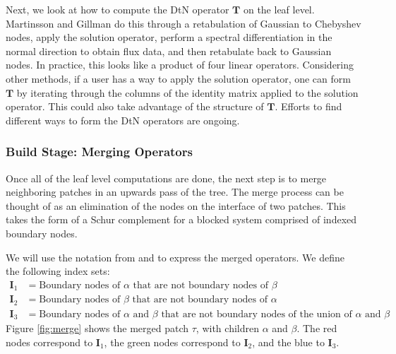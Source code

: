 Next, we look at how to compute the DtN operator $\textbf{T}$ on the leaf level. Martinsson and Gillman do this through a retabulation of Gaussian to Chebyshev nodes, apply the solution operator, perform a spectral differentiation in the normal direction to obtain flux data, and then retabulate back to Gaussian nodes. In practice, this looks like a product of four linear operators. Considering other methods, if a user has a way to apply the solution operator, one can form $\textbf{T}$ by iterating through the columns of the identity matrix applied to the solution operator. This could also take advantage of the structure of $\textbf{T}$. Efforts to find different ways to form the DtN operators are ongoing.

\subsubsection{Build Stage: Merging Operators}

Once all of the leaf level computations are done, the next step is to merge neighboring patches in an upwards pass of the tree. The merge process can be thought of as an elimination of the nodes on the interface of two patches. This takes the form of a Schur complement for a blocked system comprised of indexed boundary nodes.

We will use the notation from \cite{martinsson2015hierarchical} and \cite{gillman2014direct} to express the merged operators. We define the following index sets:
\begin{align*}
    \textbf{I}_1 &= \text{Boundary nodes of } \alpha \text{ that are not boundary nodes of } \beta \\
    \textbf{I}_2 &= \text{Boundary nodes of } \beta \text{ that are not boundary nodes of } \alpha \\
    \textbf{I}_3 &= \text{Boundary nodes of } \alpha \text{ and } \beta \text{ that are not boundary nodes of the union of } \alpha \text{ and } \beta
\end{align*}
Figure \ref{fig:merge} shows the merged patch $\tau$, with children $\alpha$ and $\beta$. The red nodes correspond to $\textbf{I}_1$, the green nodes correspond to $\textbf{I}_2$, and the blue to $\textbf{I}_3$.

